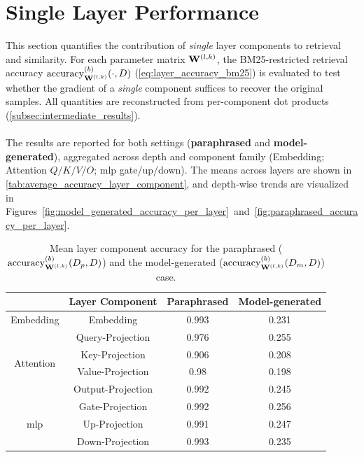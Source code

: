 \section{Single Layer Performance}\label{sec:single_layer_perf}
This section quantifies the contribution of \emph{single} layer components to retrieval and similarity. For each parameter matrix $\mathbf{W}^{(l,k)}$, the BM25-restricted retrieval accuracy $\operatorname{accuracy}^{(b)}_{\mathbf{W}^{(l,k)}}(\cdot,D)$ (\autoref{eq:layer_accuracy_bm25}) is evaluated to test whether the gradient of a \emph{single} component suffices to recover the original samples. All quantities are reconstructed from per-component dot products (\autoref{subsec:intermediate_results}).
\\\\
The results are reported for both settings (\textbf{paraphrased} and \textbf{model-generated}), aggregated across depth and component family (Embedding; Attention $Q/K/V/O$; \acrshort{mlp} gate/up/down). The means across layers are shown in \autoref{tab:average_accuracy_layer_component}, and depth-wise trends are visualized in Figures~\ref{fig:model_generated_accuracy_per_layer}~and~\ref{fig:paraphrased_accuracy_per_layer}.
\begin{table}[H]
    \centering
    \begin{tabular}{|c|c|c|c|}
        \hline
        & \textbf{Layer Component} & \textbf{Paraphrased} & \textbf{Model-generated} \\
        \hline
        \multirow{1}{5em}{Embedding}
        & Embedding & 0.993 & 0.231 \\
        \hline
        \multirow{4}{5em}{Attention}
        & Query-Projection & 0.976 & 0.255 \\
        & Key-Projection & 0.906 & 0.208 \\
        & Value-Projection & 0.98 & 0.198 \\
        & Output-Projection & 0.992 & 0.245 \\
        \hline
        \multirow{3}{5em}{\acrshort{mlp}}
        & Gate-Projection & 0.992 & 0.256 \\
        & Up-Projection & 0.991 & 0.247 \\
        & Down-Projection & 0.993 & 0.235 \\
        \hline
    \end{tabular}
    \caption{Mean layer component accuracy for the paraphrased ($\operatorname{accuracy}^{(b)}_{\mathbf{W}^{(l,k)}}(D_p,D)$) and the model-generated ($\operatorname{accuracy}^{(b)}_{\mathbf{W}^{(l,k)}}(D_m,D)$) case.}
    \label{tab:average_accuracy_layer_component}
\end{table}
